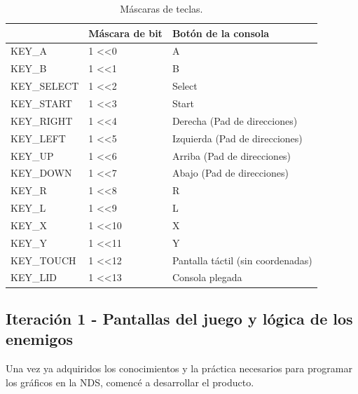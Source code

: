 \begin{table}[hbtp]
\centering
\begin{tabular}{|l|l|l|}
\hline
            & \textbf{Máscara de bit}            & \textbf{Botón de la consola}               \\ \hline
KEY\_A      & 1 \textless{}\textless 0  & A                                 \\ \hline
KEY\_B      & 1 \textless{}\textless 1  & B                                 \\ \hline
KEY\_SELECT & 1 \textless{}\textless 2  & Select                            \\ \hline
KEY\_START  & 1 \textless{}\textless 3  & Start                             \\ \hline
KEY\_RIGHT  & 1 \textless{}\textless 4  & Derecha (Pad de direcciones)      \\ \hline
KEY\_LEFT   & 1 \textless{}\textless 5  & Izquierda (Pad de direcciones)    \\ \hline
KEY\_UP     & 1 \textless{}\textless 6  & Arriba (Pad de direcciones)       \\ \hline
KEY\_DOWN   & 1 \textless{}\textless 7  & Abajo (Pad de direcciones)        \\ \hline
KEY\_R      & 1 \textless{}\textless 8  & R                                 \\ \hline
KEY\_L      & 1 \textless{}\textless 9  & L                                 \\ \hline
KEY\_X      & 1 \textless{}\textless 10 & X                                 \\ \hline
KEY\_Y      & 1 \textless{}\textless 11 & Y                                 \\ \hline
KEY\_TOUCH  & 1 \textless{}\textless 12 & Pantalla táctil (sin coordenadas) \\ \hline
KEY\_LID    & 1 \textless{}\textless 13 & Consola plegada                   \\ \hline
\end{tabular}
\caption{Máscaras de teclas.}
\label{table:gameinput}
\end{table}

\subsection{Iteración 1 - Pantallas del juego y lógica de los enemigos}

Una vez ya adquiridos los conocimientos y la práctica necesarios para programar los gráficos en la NDS, comencé a desarrollar el producto. 

